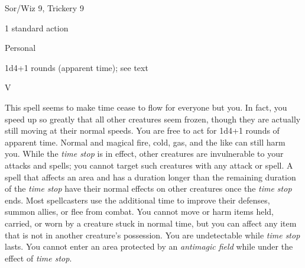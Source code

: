 
\begin{description*}
\item[Level:] Sor/Wiz 9, Trickery 9
\item[Casting Time:] 1 standard action
\item[Range:] Personal
\item[Duration:] 1d4+1 rounds (apparent time); see text
\item[Components:] V
\end{description*}

This spell seems to make time cease to flow for everyone but you. In fact, you
speed up so greatly that all other creatures seem frozen, though they are actually
still moving at their normal speeds. You are free to act for 1d4+1 rounds of apparent
time. Normal and magical fire, cold, gas, and the like can still harm you. While
the \textit{time stop} is in effect, other creatures are invulnerable to your attacks
and spells; you cannot target such creatures with any attack or spell. A spell
that affects an area and has a duration longer than the remaining duration of the
\textit{time stop} have their normal effects on other creatures once the \textit{time
stop} ends. Most spellcasters use the additional time to improve their defenses,
summon allies, or flee from combat.
You cannot move or harm items held, carried, or worn by a creature stuck in normal
time, but you can affect any item that is not in another creature's possession.
You are undetectable while \textit{time stop} lasts. You cannot enter an area protected
by an \textit{antimagic field} while under the effect of \textit{time stop}.